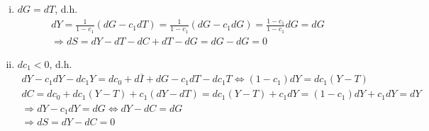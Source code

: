 \documentclass{scrartcl}
\begin{document}
\begin{enumerate}[(a)]
\begin{enumerate}[(i)]
  \item $dG=dT$, d.h.
  \begin{align*}
    dY = \frac{1}{1-c_1} (dG -c_1 dT) = \frac{1}{1-c_1}(dG -c_1 dG) = \frac{1-c_1}{1-c_1}dG = dG\\
    \Rightarrow dS = dY-dT - dC +dT -dG = dG-dG = 0
  \end{align*}
    \item $dc_1<0$, d.h.
  \begin{align*}
    dY - c_1 dY -dc_1Y =dc_0 +d\overline{I} +dG - c_1dT -dc_1T
    \Leftrightarrow (1-c_1)dY = dc_1(Y-T)\\
    dC = dc_0 + dc_1(Y-T) +c_1(dY-dT) = dc_1(Y-T) + c_1 dY = (1-c_1)dY + c_1dY = dY\\
    \Rightarrow dY-c_1 dY = dG \Leftrightarrow dY-dC = dG\\
    \Rightarrow dS = dY-dC = 0
  \end{align*}
\end{enumerate}
\end{enumerate}
\end{document}
